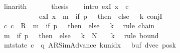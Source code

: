 \begin{isabellebody}
\ linarith\isanewline
\ \ \isamarkupfalse%
\isanewline
\ \ \isamarkupfalse%
\ {\isacharquery}{\kern0pt}thesis\isanewline
\ \ \isamarkupfalse%
\ {\isacharparenleft}{\kern0pt}intro\ exI{\isacharbrackleft}{\kern0pt}\ x\ {\isacharequal}{\kern0pt}\ c{}{\isacharbrackright}{\kern0pt}\isanewline
\ \ \ \ \ \ \ \ \ \ \ exI{\isacharbrackleft}{\kern0pt}\ x\ {\isacharequal}{\kern0pt}\ {\isachardoublequoteopen}m{}\ {\isacharplus}{\kern0pt}\ {\isacharparenleft}{\kern0pt}if\ {\isacharquery}{\kern0pt}p\ {\isacharequal}{\kern0pt}\ {}\ then\ {}\ else\ {}\ {\isacharasterisk}{\kern0pt}\ {\isacharquery}{\kern0pt}k{\isacharparenright}{\kern0pt}{\isachardoublequoteclose}{\isacharbrackright}{\kern0pt}\ conjI{\isacharparenright}{\kern0pt}\isanewline
\ \ \ \ \isamarkupfalse%
\ {\isachardoublequoteopen}{\isacharparenleft}{\kern0pt}c{}{\isacharcomma}{\kern0pt}\ c{}{\isacharparenright}{\kern0pt}\ {\isasymin}\ R{\isacharprime}{\kern0pt}\ {\isacharcircum}{\kern0pt}{\isacharcircum}{\kern0pt}\ {\isacharparenleft}{\kern0pt}m{}\ {\isacharplus}{\kern0pt}\ {\isacharparenleft}{\kern0pt}if\ {\isacharquery}{\kern0pt}p\ {\isacharequal}{\kern0pt}\ {}\ then\ {}\ else\ {}\ {\isacharasterisk}{\kern0pt}\ {\isacharquery}{\kern0pt}k{\isacharparenright}{\kern0pt}{\isacharparenright}{\kern0pt}{\isachardoublequoteclose}\ \isamarkupfalse%
\ {\isacharparenleft}{\kern0pt}rule\ chain{\isacharparenright}{\kern0pt}\isanewline
\ \ \ \ \isamarkupfalse%
\ {\isachardoublequoteopen}m{}\ {\isacharplus}{\kern0pt}\ {\isacharparenleft}{\kern0pt}if\ {\isacharquery}{\kern0pt}p\ {\isacharequal}{\kern0pt}\ {}\ then\ {}\ else\ {}\ {\isacharasterisk}{\kern0pt}\ {\isacharquery}{\kern0pt}k{\isacharparenright}{\kern0pt}\ {\isasymle}\ {\isacharquery}{\kern0pt}N\ {\isacharasterisk}{\kern0pt}\ {\isacharparenleft}{\kern0pt}{}\ {\isacharasterisk}{\kern0pt}\ {\isacharquery}{\kern0pt}k{\isacharparenright}{\kern0pt}{\isachardoublequoteclose}\ \isamarkupfalse%
\ {\isacharparenleft}{\kern0pt}rule\ bound{\isacharparenright}{\kern0pt}\isanewline
\ \ \ \ \isamarkupfalse%
\ {\isachardoublequoteopen}mt{\isacharunderscore}{\kern0pt}state\ c{}\ {\isacharequal}{\kern0pt}\ {\isacharparenleft}{\kern0pt}q{\isacharcomma}{\kern0pt}\ AR{\isacharunderscore}{\kern0pt}SimAdvance{\isacharcomma}{\kern0pt}\ k{\isacharunderscore}{\kern0pt}unidx\ {}{\isacharcomma}{\kern0pt}\ {}{\isacharcomma}{\kern0pt}\ buf{\isacharcomma}{\kern0pt}\ dvec{\isacharcomma}{\kern0pt}\ posk{\isacharparenright}{\kern0pt}{\isachardoublequoteclose}\isanewline

\end{isabellebody}
